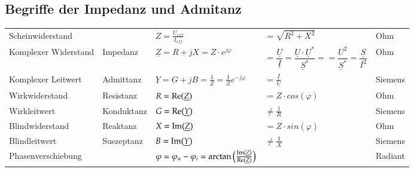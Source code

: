 \subsection{Begriffe der Impedanz und Admitanz}
\begin{tabular}{lllll}
	Scheinwiderstand & & $Z = \frac{U_{eff}}{I_{eff}} $ & $ =
	\sqrt{R^2+X^2}$ & Ohm\\ Komplexer Widerstand & Impedanz & $\underline Z = R + jX = Z \cdot e^{j \varphi}$ 
	& $  = \dfrac{\underline{U}}{\underline{I}} = \dfrac{\underline{U}\cdot\underline{U}^{\ast}}{\underline{S}^*} =  = \dfrac{U^2}{\underline{S}^*} = 
	\dfrac{\underline{S}}{I^2}$ & Ohm\\
	Komplexer Leitwert & Admittanz & $\underline Y = G + jB =
	\frac{1}{\underline Z} = \frac{1}{Z}e^{-j\varphi}$ & $= \frac{\underline{I}}{\underline{U}}$ &  Siemens\\
	Wirkwiderstand & Resistanz & $R = \operatorname{Re}(\underline Z) $ & $ = Z
	\cdot cos(\varphi)$ & Ohm\\
	Wirkleitwert & Konduktanz & $G = \operatorname{Re}(\underline Y) $ & $ \neq \frac{1}{R}$ &
	Siemens\\
	Blindwiderstand & Reaktanz & $X = \operatorname{Im}(\underline Z) $ & $ = Z
	\cdot sin(\varphi)$ & Ohm\\
	Blindleitwert & Suszeptanz & $B = \operatorname{Im}( \underline Y) $ & $ \neq \frac{1}{X}$
	& Siemens\\
	Phasenverschiebung & & $\varphi = \varphi_u - \varphi_i =
	\arctan\left(\frac{\operatorname{Im}(\underline{Z})}{\operatorname{Re}(\underline{Z})}\right)$ & &
	Radiant\\
	
\end{tabular}
\newpage
